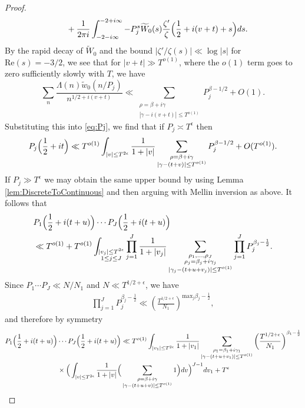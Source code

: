 \documentclass[12pt]{amsart}
\theoremstyle{plain}
\theoremstyle{definition}
\theoremstyle{remark}
\begin{document}
\begin{proof}
\begin{align*}
&\qquad+\frac{1}{2\pi i}\int_{-2-i\infty}^{-2+i\infty} -P_j^{s}\widetilde{W}_0(s)\frac{\zeta'}{\zeta}\Bigl(\frac{1}{2}+i(v+t)+s\Bigr)ds.
\end{align*}
By the rapid decay of $\widetilde{W}_0$ and the bound $|\zeta'/\zeta(s)|\ll \log{|s|}$ for $\text{Re}(s)=-3/2$, we see that for $|v+t|\gg T^{o(1)}$, where the $o(1)$ term goes to zero sufficiently slowly with $T$, we have
\[
\sum_{n}\frac{\Lambda(n)\widetilde{w}_0(n/P_j)}{n^{1/2+i(v+t)}}\ll \sum_{\substack{\rho=\beta+i\gamma\\ |\gamma-i(v+t)|\le T^{o(1)}}}P_j^{\beta-1/2}+O(1).
\]
Substituting this into \eqref{eq:Pj}, we find that if $P_j \asymp T^\epsilon$ then
\[
P_j\Bigl(\frac{1}{2}+it\Bigr)\ll T^{o(1)}\int_{|v|\leq T^{2\epsilon}} \frac{1}{1+|v|} \sum_{\substack{\rho = \beta+i\gamma\\ |\gamma-(t+v)|\le T^{o(1)}}}P_j^{\beta-1/2}+O(T^{o(1)}).
\]
If $P_j \gg T^\epsilon$ we may obtain the same upper bound by using Lemma \ref{lem:DiscreteToContinuous} and then arguing with Mellin inversion as above. It follows that
\begin{align*}
&P_1\Bigl(\frac{1}{2}+i(t+u)\Bigr)\cdots P_J\Bigl(\frac{1}{2}+i(t+u)\Bigr)  \\
&\ll T^{o(1)}+ T^{o(1)}\int_{\substack{|v_j|\leq T^{2\epsilon} \\ 1\leq j\leq J}} \prod_{j=1}^J \frac{1}{1+|v_j|}\sum_{\substack{\rho_1,\ldots,\rho_J \\ \rho_j = \beta_j + i\gamma_j \\ |\gamma_j - (t+u+v_j)|\leq T^{o(1)}}} \prod_{j=1}^J P_j^{\beta_j - \frac{1}{2}}.
\end{align*}
Since $P_1\cdots P_J\ll N/N_1$ and $N\ll T^{1/2+\epsilon}$, we have
\begin{align*}
\prod_{j=1}^J P_j^{\beta_j - \frac{1}{2}} \ll \left(\frac{T^{1/2+\epsilon}}{N_1} \right)^{\text{max}_j \beta_j - \frac{1}{2}},
\end{align*}
and therefore by symmetry
\begin{align*}
P_1\Bigl(\frac{1}{2}+i(t+u)\Bigr)&\cdots P_J\Bigl(\frac{1}{2}+i(t+u)\Bigr) \ll T^{o(1)} \int_{|v_1| \leq T^{2\epsilon}} \frac{1}{1+|v_1|}\sum_{\substack{\rho_1 = \beta_1 + i\gamma_1 \\ |\gamma - (t+u+v_1)|\leq T^{o(1)}}} \left(\frac{T^{1/2+\epsilon}}{N_1} \right)^{\beta_1 - \frac{1}{2}}  \\
&\times \Big(\int_{|v|\leq T^{2\epsilon}}\frac{1}{1+|v|}\Big(\sum_{\substack{\rho = \beta+i\gamma \\ |\gamma - (t+u+v)|\leq T^{o(1)}}} 1 \Big) dv\Big)^{J-1} dv_1+ T^\epsilon \\

\end{align*}
\end{proof}
\end{document}
